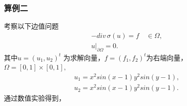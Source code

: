 \documentclass[a4paper,UTF8,titlepage,10pt]{ctexart}
\numberwithin{equation}{subsection}
\begin{document}
\subsubsection{算例二}

考察以下边值问题
$$
\begin{matrix}
	-div \, \sigma(u) = f \quad \in \Omega , \\
	u |_{\partial \Omega} = 0 .
\end{matrix}
$$ 
其中$ u = (u_1,u_2)^t $ 为求解向量，$ f = (f_1,f_2)^t $为右端向量，$ \Omega = [0,1] \times [0,1] ,$
$$
\begin{matrix}
	u_1 = x^2 sin(x-1) y^2 sin(y-1) ,
	\\
	u_2 = x^2 sin(x-1) y^2 sin(y-1) .
\end{matrix}
$$
通过数值实验得到，
\end{document}
